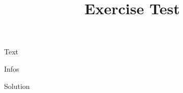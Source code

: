 \documentclass[solution, unisiegen-IAS]{../course_template/exerciseClass}
\title{Exercise Test}
\begin{document}
Text
\begin{infoblock}
	Infos
\end{infoblock}
\begin{solutionblock}Solution\end{solutionblock}
\end{document}
